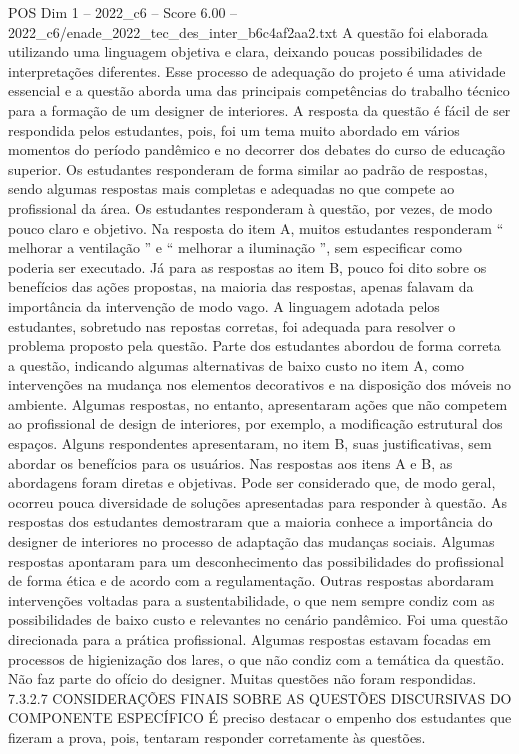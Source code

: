 \begin{textsample}{POS Dim 1 – 2022\_c6 – Score 6.00 – 2022\_c6/enade\_2022\_tec\_des\_inter\_b6c4af2aa2.txt}
A questão foi elaborada utilizando uma linguagem objetiva e clara, deixando poucas possibilidades de interpretações diferentes.
Esse processo de adequação do projeto é uma atividade essencial e a questão aborda uma das principais competências do trabalho técnico para a formação de um designer de interiores.
A resposta da questão é fácil de ser respondida pelos estudantes, pois, foi um tema muito abordado em vários momentos do período pandêmico e no decorrer dos debates do curso de educação superior.
Os estudantes responderam de forma similar ao padrão de respostas, sendo algumas respostas mais completas e adequadas no que compete ao profissional da área.
Os estudantes responderam à questão, por vezes, de modo pouco claro e objetivo.
Na resposta do item A, muitos estudantes responderam “ melhorar a ventilação ” e “ melhorar a iluminação ”, sem especificar como poderia ser executado.
Já para as respostas ao item B, pouco foi dito sobre os benefícios das ações propostas, na maioria das respostas, apenas falavam da importância da intervenção de modo vago.
A linguagem adotada pelos estudantes, sobretudo nas repostas corretas, foi adequada para resolver o problema proposto pela questão.
Parte dos estudantes abordou de forma correta a questão, indicando algumas alternativas de baixo custo no item A, como intervenções na mudança nos elementos decorativos e na disposição dos móveis no ambiente.
Algumas respostas, no entanto, apresentaram ações que não competem ao profissional de design de interiores, por exemplo, a modificação estrutural dos espaços.
Alguns respondentes apresentaram, no item B, suas justificativas, sem abordar os benefícios para os usuários.
Nas respostas aos itens A e B, as abordagens foram diretas e objetivas.
Pode ser considerado que, de modo geral, ocorreu pouca diversidade de soluções apresentadas para responder à questão.
As respostas dos estudantes demostraram que a maioria conhece a importância do designer de interiores no processo de adaptação das mudanças sociais.
Algumas respostas apontaram para um desconhecimento das possibilidades do profissional de forma ética e de acordo com a regulamentação.
Outras respostas abordaram intervenções voltadas para a sustentabilidade, o que nem sempre condiz com as possibilidades de baixo custo e relevantes no cenário pandêmico.
Foi uma questão direcionada para a prática profissional.
Algumas respostas estavam focadas em processos de higienização dos lares, o que não condiz com a temática da questão.
Não faz parte do ofício do designer.
Muitas questões não foram respondidas. 7.3.2.7 CONSIDERAÇÕES FINAIS SOBRE AS QUESTÕES DISCURSIVAS DO COMPONENTE ESPECÍFICO É preciso destacar o empenho dos estudantes que fizeram a prova, pois, tentaram responder corretamente às questões.

\end{textsample}
